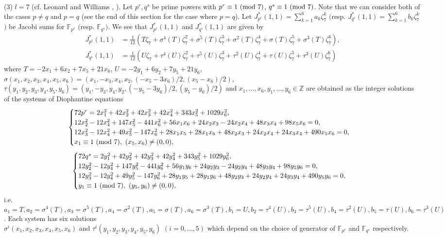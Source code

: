 \documentclass[a4paper, 11pt]{amsart}
\newcommand{\Z}{\mathbb Z}
\newcommand{\F}{\mathbb F}
\theoremstyle{plain}
\theoremstyle{definition}
\numberwithin{equation}{section}
\begin{document}
(3) $l=7$ (cf. Leonard and Williams \cite{LW75a}, \cite[Section 3.9]{BEW98}).
Let $p^r, q^s$ be prime powers with $p^r\equiv 1\ ({\rm mod}\ 7)$, $q^s\equiv 1\ ({\rm mod}\ 7)$. 
Note that we can consider both of the cases $p\neq q$ 
and $p=q$ (see the end of this section for the case where $p=q$). 
Let
$J^\ast_{p^r}(1,1)=\sum_{k=1}^{6}a_k\zeta_7^k$ $($resp. $J^\ast_{q^s}(1,1)=\sum_{k=1}^{6}b_k\zeta_7^k$$)$ 
be
Jacobi sums for $\F_{p^r}$ $($resp. $\F_{q^s}$$)$. 
We see that 
$J^\ast_{p^r}(1,1)$ and
$J^\ast_{q^s}(1,1)$
are given by 
\begin{align*}
J^\ast_{p^r}(1,1)
&=\frac{1}{12}\left(T\zeta_7+\sigma^4(T)\zeta_7^2+\sigma^5(T)\zeta_7^3
+\sigma^2(T)\zeta_7^4+\sigma(T)\zeta_7^5+\sigma^3(T)\zeta_7^6\right),\\
J^\ast_{q^s}(1,1) &=\frac{1}{12}\left(U\zeta_7+\tau^4(U)\zeta_7^2+\tau^5(U)\zeta_7^3
+\tau^2(U)\zeta_7^4+\tau(U)\zeta_7^5+\tau^3(U)\zeta_7^6\right)
\end{align*}
where $T=-2x_1+6x_2+7x_5+21x_6$, $U=-2y_1+6y_2+7y_5+21y_6$, $\sigma(x_1,x_2,x_3,x_4,x_5,x_6)=(x_1,-x_3,x_4,x_2,(-x_5-3x_6)/2,(x_5-x_6)/2)$, $\tau(y_1,y_2,y_3,y_4,y_5,y_6)=(y_1,-y_3,y_4,y_2,(-y_5-3y_6)/2,(y_5-y_6)/2)$  and
$x_1,\dots,x_6, y_1,\dots,y_6\in\Z$ are obtained as 
the integer solutions of the systems of Diophantine equations 
\begin{align}\label{eq:DS7p}
\begin{cases}
72p^r=2x_1^2+42x_2^2+42x_3^2+42x_4^2+343x_5^2+1029x_6^2, \\
12x_2^2-12x_4^2+147x_5^2-441x_6^2+56x_1x_6+24x_2x_3
-24x_2x_4+48x_3x_4+98x_5x_6=0, \\
12x_3^2-12x_4^2+49x_5^2-147x_6^2+28x_1x_5+28x_1x_6+48x_2x_3+24x_2x_4+24x_3x_4+490x_5x_6=0,\\
x_1\equiv 1\ ({\rm mod}\ 7),\ (x_5,x_6)\neq (0,0),\\
\end{cases}
\end{align}
\begin{align*} %
\begin{cases}
72q^s=2y_1^2+42y_2^2+42y_3^2+42y_4^2+343y_5^2+1029y_6^2, \\
12y_2^2-12y_4^2+147y_5^2-441y_6^2+56y_1y_6+24y_2y_3
-24y_2y_4+48y_3y_4+98y_5y_6=0, \\
12y_3^2-12y_4^2+49y_5^2-147y_6^2+28y_1y_5+28y_1y_6+48y_2y_3+24y_2y_4+24y_3y_4+490y_5y_6=0,\\
y_1\equiv 1\ ({\rm mod}\ 7),\ (y_5,y_6)\neq (0,0),\\
\end{cases}
\end{align*}
i.e. 
$a_1=T, a_2=\sigma^4(T), a_3=\sigma^5(T), a_4=\sigma^2(T),a_5=\sigma(T), a_6=\sigma^3(T),
b_1=U, b_2=\tau^4(U), b_3=\tau^5(U), b_4=\tau^2(U),b_5=\tau(U), b_6=\tau^3(U)$. 
Each system has six solutions \\$\sigma^i(x_1,x_2,x_3,x_4,x_5,x_6)$ and $\tau^i(y_1,y_2,y_3,y_4,y_5,y_6)$ $(i=0,\dots,5)$ 
which depend on the choice of generator of $\F_{p^r}$ and $\F_{q^s}$ respectively. 
\end{document}
